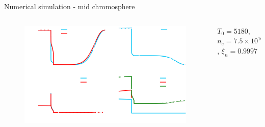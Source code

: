 \documentclass[10pt,aspectratio=169,usenames,dvipsnames]{beamer}
\begin{document}
\begin{frame}{Numerical simulation - mid chromosphere}
\begin{columns}
\begin{column}{0.8\textwidth}
\begin{figure}
    \includegraphics[width=0.95\linewidth]{2023StAndrewsAstro/Figures/context_midc_corrected.png}
    \label{fig:upperchromocontext}
\end{figure}
\end{column}
\begin{column}{0.2\textwidth}
    $T_0=5180$, $n_e=7.5\times 10^{16}$, $\xi_n=0.9997$
\end{column}
\end{columns}
\end{frame}

\end{document}
